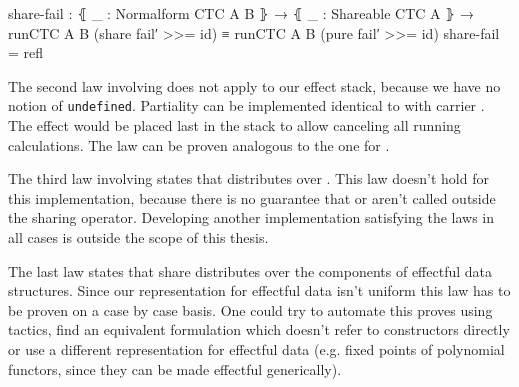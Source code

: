 \begin{code}
share-fail : ⦃ _ : Normalform CTC A B ⦄ → ⦃ _ : Shareable CTC A ⦄ →
  runCTC {A} {B} (share fail′ >>= id) ≡ runCTC {A} {B} (pure fail′ >>= id)
share-fail = refl
\end{code}
The second law involving  does not apply to our effect
stack, because we have no notion of \texttt{undefined}.
Partiality can be implemented identical to  with carrier
.
The effect would be placed last in the stack to allow canceling all running
calculations.
The law can be proven analogous to the one for .

The third law involving  states that 
distributes over .
This law doesn't hold for this implementation, because there is no guarantee
that  or  aren't called outside the sharing
operator.
Developing another implementation satisfying the laws in all cases is outside
the scope of this thesis.

The last law states that share distributes over the components of effectful
data structures.
Since our representation for effectful data isn't uniform this law has to be
proven on a case by case basis.
One could try to automate this proves using tactics, find an equivalent
formulation which doesn't refer to constructors directly or use a different
representation for effectful data (e.g. fixed points of polynomial functors,
since they can be made effectful generically).
